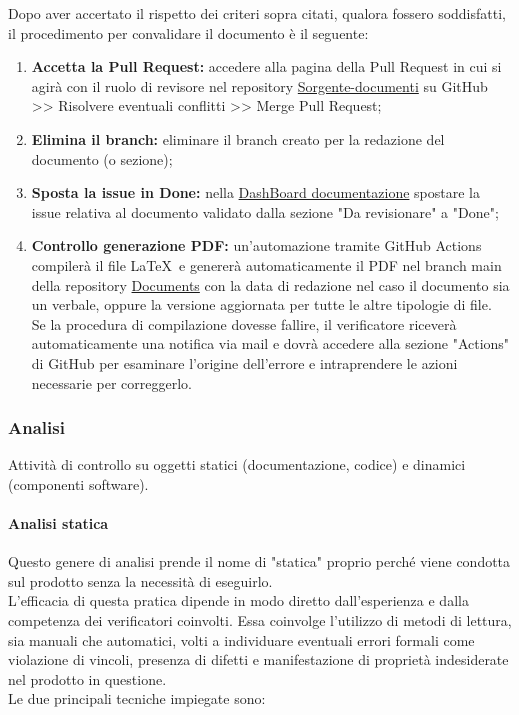 Dopo aver accertato il rispetto dei criteri sopra citati, qualora fossero soddisfatti, il procedimento per convalidare il documento è il seguente:

\begin{enumerate}
    \item \textbf{Accetta la Pull Request:} 
        accedere alla pagina della Pull Request in cui si agirà con il ruolo di revisore nel repository \href{https://github.com/ByteOps-swe/Sorgente-documenti}{Sorgente-documenti} su GitHub >> Risolvere eventuali conflitti >> Merge Pull Request;
    \item \textbf{Elimina il branch:} 
        eliminare il branch creato per la redazione del documento (o sezione);
    \item \textbf{Sposta la issue in Done:} 
        nella \href{https://github.com/orgs/ByteOps-swe/projects/1/views/1}{DashBoard documentazione} spostare la issue relativa al documento validato dalla sezione "Da revisionare" a "Done";
    \item \textbf{Controllo generazione PDF:} 
        un'automazione tramite GitHub Actions compilerà il file \LaTeX\ e genererà automaticamente il PDF nel branch main della repository \href{https://github.com/ByteOps-swe/Documents}{Documents} con la data di redazione nel caso il documento sia un verbale, oppure la versione aggiornata per tutte le altre tipologie di file. \\
        Se la procedura di compilazione dovesse fallire, il verificatore riceverà automaticamente una notifica via mail e dovrà accedere alla sezione "Actions" di GitHub per esaminare l'origine dell'errore e intraprendere le azioni necessarie per correggerlo.
\end{enumerate}

\subsubsection{Analisi}
Attività di controllo su oggetti statici (documentazione, codice) e dinamici (componenti software).

\paragraph{Analisi statica}
Questo genere di analisi prende il nome di "statica" proprio perché viene condotta sul prodotto senza la necessità di eseguirlo. \\ L'efficacia di questa pratica dipende in modo diretto dall'esperienza e dalla competenza dei verificatori coinvolti. Essa coinvolge l'utilizzo di metodi di lettura, sia manuali che automatici, volti a individuare eventuali errori formali come violazione di vincoli, presenza di difetti e manifestazione di proprietà indesiderate nel prodotto in questione. \\
Le due principali tecniche impiegate sono:

